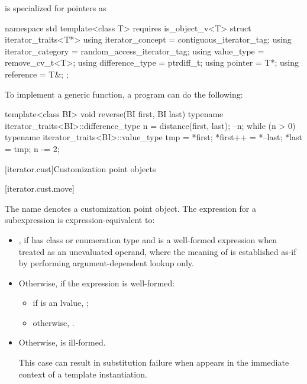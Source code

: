 \pnum
{} is specialized for pointers as
\begin{codeblock}
namespace std {
  template<class T>
    requires is_object_v<T>
  struct iterator_traits<T*> {
    using iterator_concept  = contiguous_iterator_tag;
    using iterator_category = random_access_iterator_tag;
    using value_type        = remove_cv_t<T>;
    using difference_type   = ptrdiff_t;
    using pointer           = T*;
    using reference         = T&;
  };
}
\end{codeblock}

\pnum
\begin{example}
To implement a generic
function, a \Cpp{} program can do the following:
\begin{codeblock}
template<class BI>
void reverse(BI first, BI last) {
  typename iterator_traits<BI>::difference_type n = distance(first, last);
  --n;
  while (n > 0) {
    typename iterator_traits<BI>::value_type tmp = *first;
    *first++ = *--last;
    *last = tmp;
    n -= 2;
  }
}
\end{codeblock}
\end{example}

[iterator.cust]{Customization point objects}

[iterator.cust.move]{}

%
\pnum
The name  denotes
a customization point object.
The expression  for a subexpression  is
expression-equivalent to:

\begin{itemize}
\item {}, if
 has class or enumeration type and
 is a well-formed expression when treated as an unevaluated operand,
where the meaning of  is established as-if by performing
argument-dependent lookup only.

\item Otherwise, if the expression  is well-formed:
\begin{itemize}
\item if  is an lvalue, ;

\item otherwise, .
\end{itemize}

\item Otherwise,  is ill-formed.
\begin{note}
This case can result in substitution failure when 
appears in the immediate context of a template instantiation.
\end{note}
\end{itemize}


